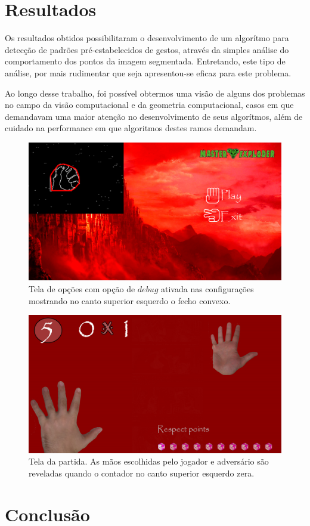 \documentclass[12pt]{article}
\begin{document}
\section{Resultados}

Os resultados obtidos possibilitaram o desenvolvimento de um algorítmo para detecção de padrões pré-estabelecidos de gestos, através da simples análise do comportamento dos pontos da imagem segmentada. Entretando, este tipo de análise, por mais rudimentar que seja apresentou-se eficaz para este problema. 

Ao longo desse trabalho, foi possível obtermos uma visão de alguns dos problemas no campo da visão computacional e da geometria computacional, casos em que demandavam uma maior atenção no desenvolvimento de seus algorítmos, além de cuidado na performance em que algoritmos destes ramos demandam.

\begin{figure}[H]
\centering
\includegraphics[width=.60\textwidth]{debugon.png}
\caption{Tela de opções com opção de $debug$ ativada nas configurações mostrando no canto superior esquerdo o fecho convexo.} \label{fig1}
\end{figure}

\begin{figure}[H]
\centering
\includegraphics[width=.60\textwidth]{jogo.png}
\caption{Tela da partida. As mãos escolhidas pelo jogador e adversário são reveladas quando o contador no canto superior esquerdo zera.} \label{fig1}
\end{figure}

\section{Conclusão}
\end{document}
